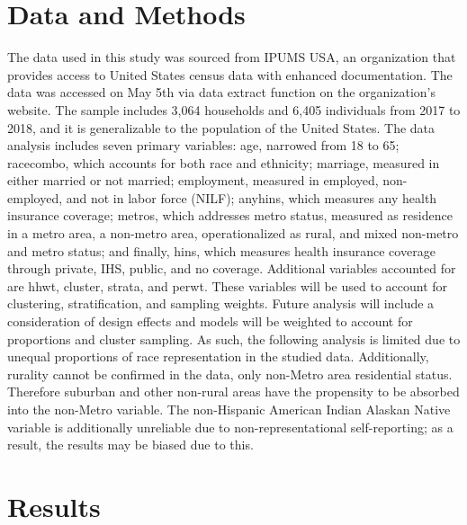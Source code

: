 \documentclass[11pt,]{article}
\begin{document}
\hypertarget{data-and-methods}{%
\section{Data and Methods}\label{data-and-methods}}

The data used in this study was sourced from IPUMS USA, an organization
that provides access to United States census data with enhanced
documentation. The data was accessed on May 5th via data extract
function on the organization's website. The sample includes 3,064
households and 6,405 individuals from 2017 to 2018, and it is
generalizable to the population of the United States. The data analysis
includes seven primary variables: age, narrowed from 18 to 65;
racecombo, which accounts for both race and ethnicity; marriage,
measured in either married or not married; employment, measured in
employed, non-employed, and not in labor force (NILF); anyhins, which
measures any health insurance coverage; metros, which addresses metro
status, measured as residence in a metro area, a non-metro area,
operationalized as rural, and mixed non-metro and metro status; and
finally, hins, which measures health insurance coverage through private,
IHS, public, and no coverage. Additional variables accounted for are
hhwt, cluster, strata, and perwt. These variables will be used to
account for clustering, stratification, and sampling weights. Future
analysis will include a consideration of design effects and models will
be weighted to account for proportions and cluster sampling. As such,
the following analysis is limited due to unequal proportions of race
representation in the studied data. Additionally, rurality cannot be
confirmed in the data, only non-Metro area residential status. Therefore
suburban and other non-rural areas have the propensity to be absorbed
into the non-Metro variable. The non-Hispanic American Indian Alaskan
Native variable is additionally unreliable due to non-representational
self-reporting; as a result, the results may be biased due to this.

\hypertarget{results}{%
\section{Results}\label{results}}
\end{document}

